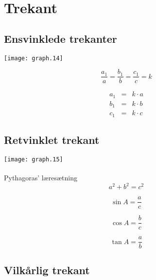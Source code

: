\documentclass[11pt,a5paper,fleqn,leqno]{book}
\begin{document}
\newpage

\section{Trekant}

\subsection{Ensvinklede trekanter}

\texttt{[image: graph.14]}

\begin{equation}
\frac{a_1}{a} = \frac{b_1}{b} = \frac{c_1}{c} = k
\end{equation}

\begin{eqnarray}
a_1 & = & k \cdot a \\
b_1 & = & k \cdot b \nonumber \\
c_1 & = & k \cdot c \nonumber
\end{eqnarray}

\vfill

\subsection{Retvinklet trekant}

\texttt{[image: graph.15]}
\\
\\
Pythagoras' læresætning 
\begin{equation}
a^2 + b^2 = c^2
\end{equation}

\begin{equation}
\sin A = \frac{a}{c}
\end{equation}

\begin{equation}
\cos A = \frac{b}{c}
\end{equation}

\begin{equation}
\tan A = \frac{a}{b}
\end{equation}

\vfill

\subsection{Vilkårlig trekant}
\end{document}
